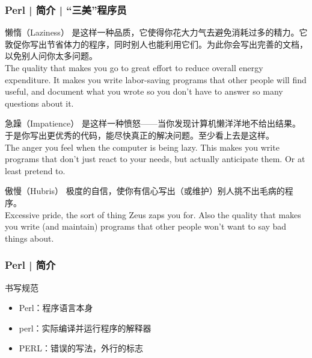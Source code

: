 \begin{frame}
  \frametitle{Perl | 简介 | “三美”程序员}
  \vspace{-0.5em}
  \begin{block}{懒惰（Laziness）}
 {\footnotesize   是这样一种品质，它使得你花大力气去避免消耗过多的精力。它敦促你写出节省体力的程序，同时别人也能利用它们。为此你会写出完善的文档，以免别人问你太多问题。\\
 The quality that makes you go to great effort to reduce overall energy expenditure. It makes you write labor-saving programs that other people will find useful, and document what you wrote so you don't have to answer so many questions about it.}
  \end{block}
  \vspace{-0.5em}
  \begin{block}{急躁（Impatience）}
{\footnotesize
    是这样一种愤怒——当你发现计算机懒洋洋地不给出结果。于是你写出更优秀的代码，能尽快真正的解决问题。至少看上去是这样。\\
    The anger you feel when the computer is being lazy. This makes you write programs that don't just react to your needs, but actually anticipate them. Or at least pretend to.}
  \end{block}
  \vspace{-0.5em}
  \begin{block}{傲慢（Hubris）}
{\footnotesize
    极度的自信，使你有信心写出（或维护）别人挑不出毛病的程序。\\
    Excessive pride, the sort of thing Zeus zaps you for. Also the quality that makes you write (and maintain) programs that other people won't want to say bad things about.}
  \end{block}
\end{frame}

\begin{frame}
  \frametitle{Perl | 简介}
  \begin{block}{\alert{书写规范}}
    \begin{itemize}
      \item Perl：程序语言本身
      \item perl：实际编译并运行程序的解释器
      \item PERL：错误的写法，外行的标志
    \end{itemize}
  \end{block}
\end{frame}

